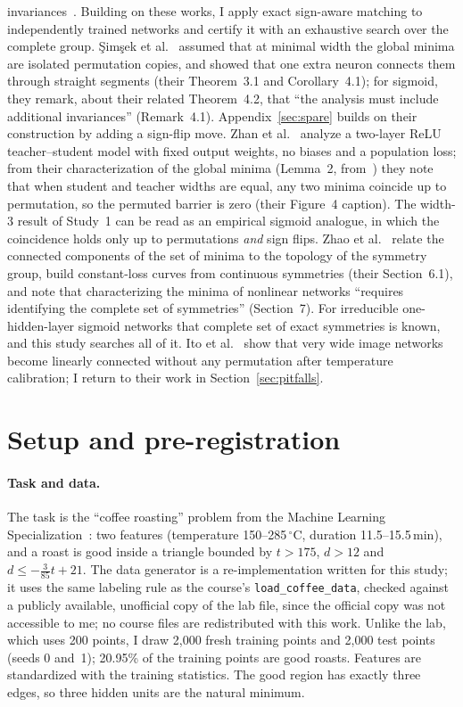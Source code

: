 \documentclass[11pt]{article}
\begin{document}
invariances~\cite[Sections~3.1--3.2]{kanoh2025linear}. Building on these works, I apply exact sign-aware matching to independently trained networks and certify it with an exhaustive search over the complete group. Şimşek et al.~\cite{simsek2021geometry} assumed that at minimal width the global minima are isolated permutation copies, and showed that one extra neuron connects them through straight segments (their Theorem~3.1 and Corollary~4.1); for sigmoid, they remark, about their related Theorem~4.2, that ``the analysis must include additional invariances'' (Remark~4.1). Appendix~\ref{sec:spare} builds on their construction by adding a sign-flip move. Zhan et al.~\cite{zhan2025analyzing} analyze a two-layer ReLU teacher--student model with fixed output weights, no biases and a population loss; from their characterization of the global minima (Lemma~2, from~\cite{lin2024exploring}) they note that when student and teacher widths are equal, any two minima coincide up to permutation, so the permuted barrier is zero (their Figure~4 caption). The width-3 result of Study~1 can be read as an empirical sigmoid analogue, in which the coincidence holds only up to permutations \emph{and} sign flips. Zhao et al.~\cite{zhao2025understanding} relate the connected components of the set of minima to the topology of the symmetry group, build constant-loss curves from continuous symmetries (their Section~6.1), and note that characterizing the minima of nonlinear networks ``requires identifying the complete set of symmetries'' (Section~7). For irreducible one-hidden-layer sigmoid networks that complete set of exact symmetries is known, and this study searches all of it. Ito et al.~\cite{ito2026permutations} show that very wide image networks become linearly connected without any permutation after temperature calibration; I return to their work in Section~\ref{sec:pitfalls}.

\section{Setup and pre-registration}
\label{sec:setup}

\paragraph{Task and data.} The task is the ``coffee roasting'' problem from the Machine Learning Specialization~\cite{ng2022mls}: two features (temperature 150--285\,$^\circ$C, duration 11.5--15.5\,min), and a roast is good inside a triangle bounded by $t > 175$, $d > 12$ and $d \le -\tfrac{3}{85}t + 21$. The data generator is a re-implementation written for this study; it uses the same labeling rule as the course's \texttt{load\_coffee\_data}, checked against a publicly available, unofficial copy of the lab file, since the official copy was not accessible to me; no course files are redistributed with this work. Unlike the lab, which uses 200 points, I draw 2{,}000 fresh training points and 2{,}000 test points (seeds 0 and~1); 20.95\% of the training points are good roasts. Features are standardized with the training statistics. The good region has exactly three edges, so three hidden units are the natural minimum.
\end{document}
